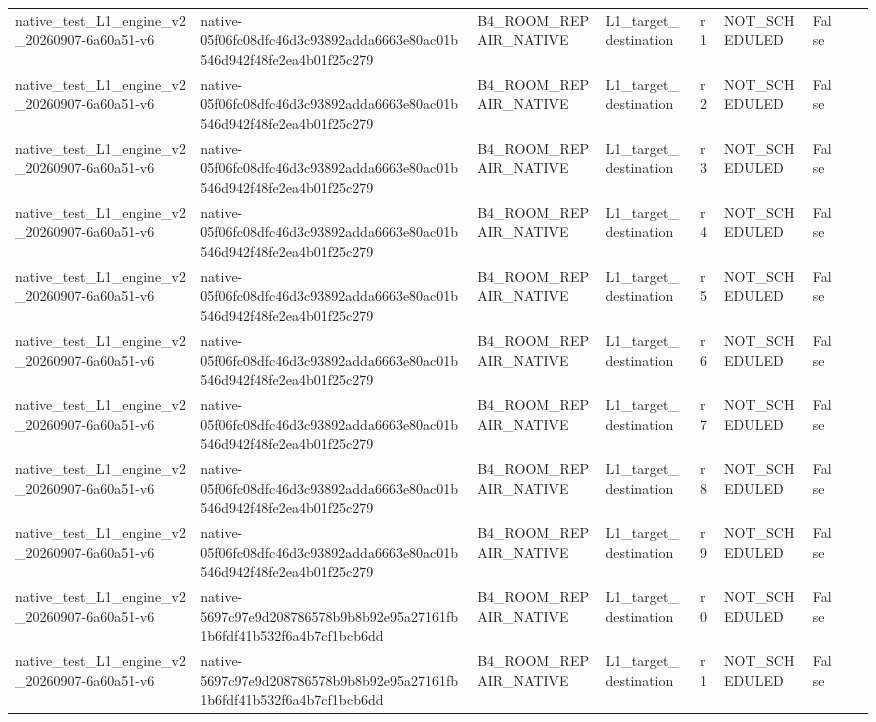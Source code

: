 \begin{tabular}{lllllllll}
native\_test\_L1\_engine\_v2\_20260907-6a60a51-v6 & native-05f06fc08dfc46d3c93892adda6663e80ac01b546d942f48fe2ea4b01f25c279 & B4\_ROOM\_REPAIR\_NATIVE & L1\_target\_destination & r1 & NOT\_SCHEDULED & False &  &  \\
native\_test\_L1\_engine\_v2\_20260907-6a60a51-v6 & native-05f06fc08dfc46d3c93892adda6663e80ac01b546d942f48fe2ea4b01f25c279 & B4\_ROOM\_REPAIR\_NATIVE & L1\_target\_destination & r2 & NOT\_SCHEDULED & False &  &  \\
native\_test\_L1\_engine\_v2\_20260907-6a60a51-v6 & native-05f06fc08dfc46d3c93892adda6663e80ac01b546d942f48fe2ea4b01f25c279 & B4\_ROOM\_REPAIR\_NATIVE & L1\_target\_destination & r3 & NOT\_SCHEDULED & False &  &  \\
native\_test\_L1\_engine\_v2\_20260907-6a60a51-v6 & native-05f06fc08dfc46d3c93892adda6663e80ac01b546d942f48fe2ea4b01f25c279 & B4\_ROOM\_REPAIR\_NATIVE & L1\_target\_destination & r4 & NOT\_SCHEDULED & False &  &  \\
native\_test\_L1\_engine\_v2\_20260907-6a60a51-v6 & native-05f06fc08dfc46d3c93892adda6663e80ac01b546d942f48fe2ea4b01f25c279 & B4\_ROOM\_REPAIR\_NATIVE & L1\_target\_destination & r5 & NOT\_SCHEDULED & False &  &  \\
native\_test\_L1\_engine\_v2\_20260907-6a60a51-v6 & native-05f06fc08dfc46d3c93892adda6663e80ac01b546d942f48fe2ea4b01f25c279 & B4\_ROOM\_REPAIR\_NATIVE & L1\_target\_destination & r6 & NOT\_SCHEDULED & False &  &  \\
native\_test\_L1\_engine\_v2\_20260907-6a60a51-v6 & native-05f06fc08dfc46d3c93892adda6663e80ac01b546d942f48fe2ea4b01f25c279 & B4\_ROOM\_REPAIR\_NATIVE & L1\_target\_destination & r7 & NOT\_SCHEDULED & False &  &  \\
native\_test\_L1\_engine\_v2\_20260907-6a60a51-v6 & native-05f06fc08dfc46d3c93892adda6663e80ac01b546d942f48fe2ea4b01f25c279 & B4\_ROOM\_REPAIR\_NATIVE & L1\_target\_destination & r8 & NOT\_SCHEDULED & False &  &  \\
native\_test\_L1\_engine\_v2\_20260907-6a60a51-v6 & native-05f06fc08dfc46d3c93892adda6663e80ac01b546d942f48fe2ea4b01f25c279 & B4\_ROOM\_REPAIR\_NATIVE & L1\_target\_destination & r9 & NOT\_SCHEDULED & False &  &  \\
native\_test\_L1\_engine\_v2\_20260907-6a60a51-v6 & native-5697c97e9d208786578b9b8b92e95a27161fb1b6fdf41b532f6a4b7cf1bcb6dd & B4\_ROOM\_REPAIR\_NATIVE & L1\_target\_destination & r0 & NOT\_SCHEDULED & False &  &  \\
native\_test\_L1\_engine\_v2\_20260907-6a60a51-v6 & native-5697c97e9d208786578b9b8b92e95a27161fb1b6fdf41b532f6a4b7cf1bcb6dd & B4\_ROOM\_REPAIR\_NATIVE & L1\_target\_destination & r1 & NOT\_SCHEDULED & False &  &  \\

\end{tabular}
